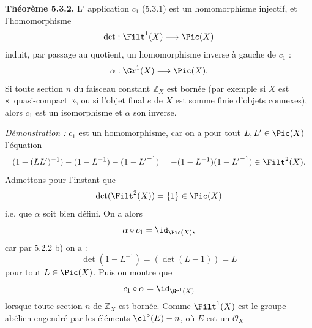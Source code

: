 \textbf{Théorème 5.3.2.} L'%
application \(c_1\) (5.3.1) est un homomorphisme injectif, et l'homomorphisme
\[
 \det:\Filt^1(X)\longrightarrow\Pic(X)
\]
induit, par passage au quotient, un homomorphisme inverse à gauche de \(c_1\) :
\[
 \alpha:\Gr^1(X)\longrightarrow\Pic(X).
\]
Si toute section \(n\) du faisceau constant \(\mathbb Z_X\) est bornée (par exemple si \(X\) est «~quasi-compact~», ou si l'objet final \(e\) de \(X\) est somme finie d'objets connexes), alors \(c_1\) est un isomorphisme et \(\alpha\) son inverse.

\emph{Démonstration :} \(c_1\) est un homomorphisme, car on a pour tout \(L,L'\in\Pic(X)\) l'équation
\[
 (1-(LL')^{-1})-(1-L^{-1})-(1-{L'}^{-1})
 =
 -(1-L^{-1})(1-{L'}^{-1})\in\Filt^2(X).
\]
Admettons pour l'instant que
\[
 \det(\Filt^2(X))=\{1\}\in\Pic(X)
\]
i.e. que \(\alpha\) soit bien défini. On a alors
\[
 \alpha\circ c_1=\id_{\Pic(X)},
\]
car par 5.2.2 b) on a :
\[
 \det(1-L^{-1})=(\det(L-1))=L
\]
pour tout \(L\in\Pic(X)\). Puis on montre que
\[
 c_1\circ\alpha=\id_{\Gr^1(X)}
\]
lorsque toute section \(n\) de \(\mathbb Z_X\) est bornée. Comme \(\Filt^1(X)\) est le groupe abélien engendré par les éléments \(\cl^\circ(E)-n\), où \(E\) est un \(\mathcal O_X\)-
